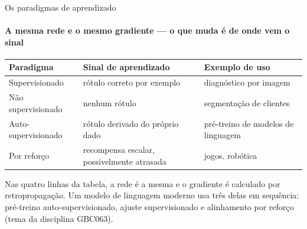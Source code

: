 \documentclass[aspectratio=169, 11pt]{beamer}
\begin{document}
\begin{frame}{Os paradigmas de aprendizado}
  \framesubtitle{A mesma rede e o mesmo gradiente — o que muda é de onde vem o sinal}

  \begin{center}\footnotesize
  \begin{tabular}{@{}lp{4.1cm}p{4.1cm}@{}}
    \toprule
    \textbf{Paradigma} & \textbf{Sinal de aprendizado} & \textbf{Exemplo de uso}\\
    \midrule
    Supervisionado & rótulo correto por exemplo & diagnóstico por imagem\\
    Não supervisionado & nenhum rótulo & segmentação de clientes\\
    Auto-supervisionado & rótulo derivado do próprio dado & pré-treino de modelos de linguagem\\
    Por reforço & recompensa escalar, possivelmente atrasada & jogos, robótica\\
    \bottomrule
  \end{tabular}
  \end{center}

  \begin{ideiabox}
    Nas quatro linhas da tabela, a rede é a mesma e o gradiente é calculado
    por retropropagação. Um modelo de linguagem moderno usa três delas em
    sequência: pré-treino auto-supervisionado, ajuste supervisionado e
    alinhamento por reforço (tema da disciplina GBC063).
  \end{ideiabox}
\end{frame}
\end{document}
